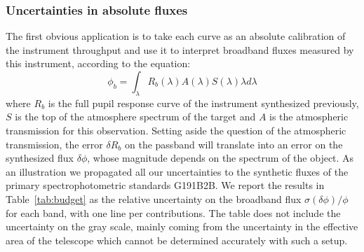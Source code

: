 \subsubsection{Uncertainties in absolute fluxes}
\label{sec:absolute}

The first obvious application is to take
each curve as an absolute calibration of the instrument throughput and
use it to interpret broadband fluxes measured by this instrument,
according to the equation:
\begin{equation}
  \label{eq:mb}
  \phi_b = \int_\lambda  R_b(\lambda) A(\lambda) S(\lambda) \lambda d\lambda
\end{equation}
where $R_b$ is the full pupil response curve of the instrument
synthesized previously, $S$ is the top of the atmosphere spectrum of
the target and $A$ is the atmospheric transmission for this
observation. Setting aside the question of the atmospheric
transmission, the error $\delta R_b$ on the passband will translate
into an error on the synthesized flux $\delta \phi$, whose magnitude
depends on the spectrum of the object. As an illustration we
propagated all our uncertainties to the synthetic fluxes of the
primary spectrophotometric standards G191B2B. We report the results in
Table~\ref{tab:budget} as the relative uncertainty on the broadband
flux $\sigma(\delta \phi)/\phi$ for each band, with one line per
contributions. The table does not include the uncertainty on the gray
scale, mainly coming from the uncertainty in the effective area of the
telescope which cannot be determined accurately with such a setup. 

